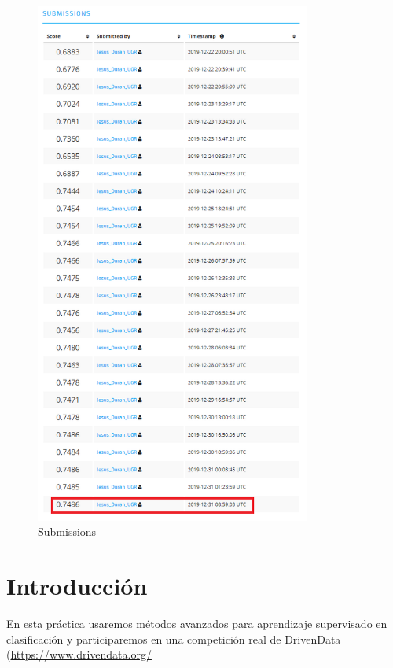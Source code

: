 	\begin{figure}[H]
		\centering
		\includegraphics[width=0.81\textwidth]{img/subs.png}
		\caption{Submissions}
	\end{figure}
	
	\tableofcontents %
	\newpage
	
	
	
	\section{Introducción}
	
		\hspace{1.5cm} En esta práctica usaremos métodos avanzados para aprendizaje supervisado en clasificación y participaremos en una competición real de DrivenData (\url{https://www.drivendata.org/}
	
